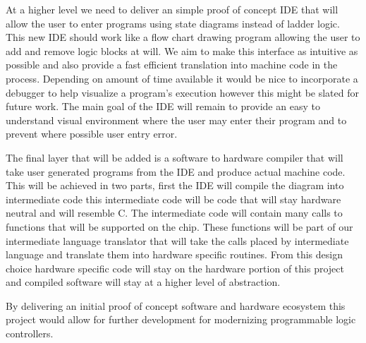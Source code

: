 At a higher level we need to deliver an simple proof of concept IDE that will allow the user to enter programs using state diagrams instead of ladder logic. This new IDE should work like a flow chart drawing program allowing the user to add and remove logic blocks at will. We aim to make this interface as intuitive as possible and also provide a fast efficient translation into machine code in the process. Depending on amount of time available it would be nice to incorporate a debugger to help visualize a program's execution however this might be slated for future work. The main goal of the IDE will remain to provide an easy to understand visual environment where the user may enter their program and to prevent where possible user entry error.

The final layer that will be added is a software to hardware compiler that will take user generated programs from the IDE and produce actual machine code. This will be achieved in two parts, first the IDE will compile the diagram into intermediate code this intermediate code will be code that will stay hardware neutral and will resemble C. The intermediate code will contain many calls to functions that will be supported on the chip. These functions will be part of our intermediate language translator that will take the calls placed by intermediate language and translate them into hardware specific routines. From this design choice hardware specific code will stay on the hardware portion of this project and compiled software will stay at a higher level of abstraction.

By delivering an initial proof of concept software and hardware ecosystem this project would allow for further development for modernizing programmable logic controllers.

